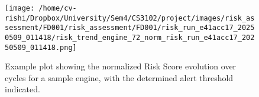 \begin{figure}[t]
	\centering
	\texttt{[image: /home/cv-rishi/Dropbox/University/Sem4/CS3102/project/images/risk\_assessment/FD001/risk\_assessment/FD001/risk\_run\_e41acc17\_20250509\_011418/risk\_trend\_engine\_72\_norm\_risk\_run\_e41acc17\_20250509\_011418.png]}
	\caption{Example plot showing the normalized Risk Score evolution over cycles for a sample engine, with the determined alert threshold indicated.}
	\label{fig:risk_score_trend}
\end{figure}
